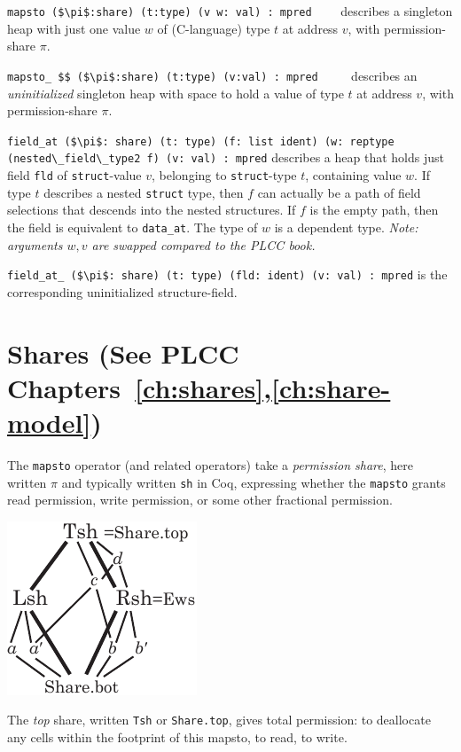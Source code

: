 \documentclass[12pt,fleqn,openany,oneside,showtrims]{memoir}
\newcommand{\ychapter}[2]{\chapter[#1]{#1 \hfill \normalsize #2}}
\begin{document}
\noindent \lstinline{mapsto ($\pi$:share) (t:type) (v w: val) : mpred}
$\qquad$describes a singleton heap with
just one value $w$ of (C-language) type $t$
at address $v$, with permission-share $\pi$.

\noindent \lstinline{mapsto_ $$ ($\pi$:share) (t:type) (v:val) : mpred}
$\qquad$
describes an \emph{uninitialized} singleton heap with
space to hold a value of type $t$
at address $v$, with permission-share $\pi$.

\noindent
\lstinline{field_at ($\pi$: share) (t: type) (f: list ident) (w: reptype (nested\_field\_type2 f) (v: val) : mpred}
\newline  describes a heap
that holds just field \lstinline{fld} 
of \lstinline{struct}-value $v$,
belonging to \lstinline{struct}-type $t$, 
containing value $w$.
If type $t$ describes a nested \lstinline{struct} type,
then $f$ can actually be a path of field selections
that descends into the nested structures.
If $f$ is the empty path, then the field is equivalent to
\lstinline{data_at}.
The type of $w$ is a dependent type.
\emph{Note: arguments $w,v$ are swapped compared to the PLCC book.}

\lstinline{field_at_ ($\pi$: share) (t: type) (fld: ident) (v: val) : mpred}
\newline is the corresponding uninitialized structure-field.

\ychapter{Shares}{(See PLCC Chapters~\ref{ch:shares},\ref{ch:share-model})}
The \lstinline{mapsto} operator (and related operators) take a
\emph{permission share}, here written $\pi$ and typically
written \lstinline{sh} in Coq, expressing whether
the \lstinline{mapsto} grants read permission, write permission,
or some other fractional permission.

\centerline{\includegraphics[scale=1.25]{graphics/shares.pdf}}

The \emph{top} share, written \lstinline{Tsh} or
\lstinline{Share.top}, gives total permission: to deallocate any cells
within the footprint of this mapsto, to read, to write.
\end{document}
